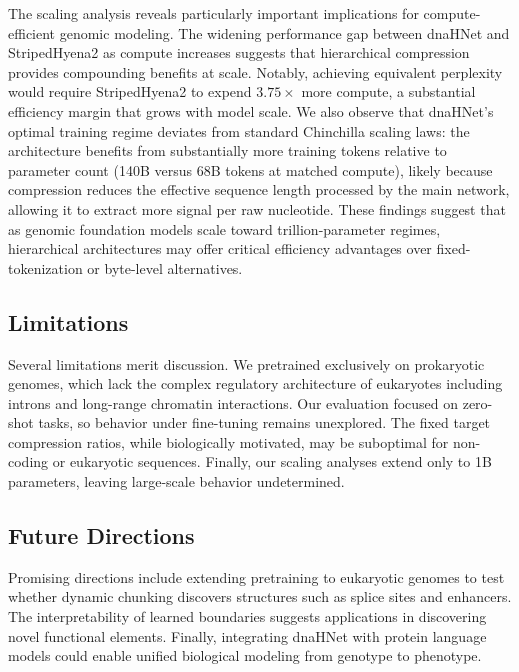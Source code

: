 \documentclass{article}
\theoremstyle{plain}
\theoremstyle{definition}
\theoremstyle{remark}
\begin{document}
The scaling analysis reveals particularly important implications for compute-efficient genomic modeling. The widening performance gap between dnaHNet and StripedHyena2 as compute increases suggests that hierarchical compression provides compounding benefits at scale. Notably, achieving equivalent perplexity would require StripedHyena2 to expend $3.75 \times$ more compute, a substantial efficiency margin that grows with model scale. We also observe that dnaHNet's optimal training regime deviates from standard Chinchilla scaling laws: the architecture benefits from substantially more training tokens relative to parameter count (140B versus 68B tokens at matched compute), likely because compression reduces the effective sequence length processed by the main network, allowing it to extract more signal per raw nucleotide. These findings suggest that as genomic foundation models scale toward trillion-parameter regimes, hierarchical architectures may offer critical efficiency advantages over fixed-tokenization or byte-level alternatives.


\subsection{Limitations}

Several limitations merit discussion. We pretrained exclusively on prokaryotic genomes, which lack the complex regulatory architecture of eukaryotes including introns and long-range chromatin interactions. Our evaluation focused on zero-shot tasks, so behavior under fine-tuning remains unexplored. The fixed target compression ratios, while biologically motivated, may be suboptimal for non-coding or eukaryotic sequences. Finally, our scaling analyses extend only to 1B parameters, leaving large-scale behavior undetermined.

\subsection{Future Directions}

Promising directions include extending pretraining to eukaryotic genomes to test whether dynamic chunking discovers structures such as splice sites and enhancers. The interpretability of learned boundaries suggests applications in discovering novel functional elements. Finally, integrating dnaHNet with protein language models could enable unified biological modeling from genotype to phenotype.
\end{document}
